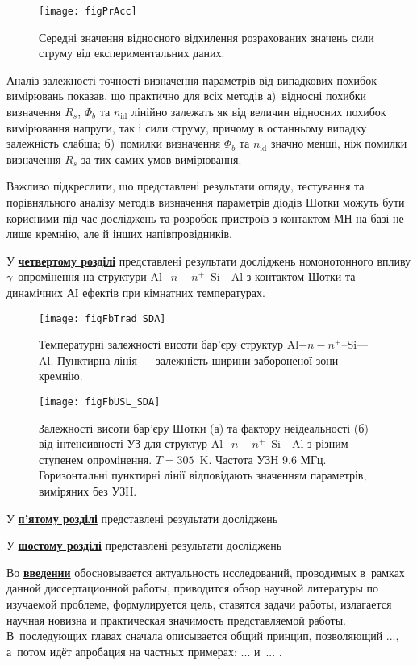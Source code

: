 \documentclass[a5paper,10pt,twoside,openany,article]{memoir} %
\begin{document}
\begin{figure}
\center
\texttt{[image: figPrAcc]}%
\caption{\label{figPrAcc}
Середні значення відносного відхилення розрахованих значень сили струму від експериментальних даних.
}
\end{figure}


Аналіз залежності точності визначення параметрів від випадкових похибок вимірювань показав, що практично для всіх методів
а)~відносні похибки визначення $R_s$, $\Phi_b$ та $n_\mathrm{id}$ лінійно залежать як від величин відносних похибок вимірювання напруги, так і сили струму, причому в останньому випадку залежність слабша;
б)~помилки визначення $\Phi_b$ та $n_\mathrm{id}$ значно менші, ніж помилки визначення $R_s$ за тих самих умов вимірювання.

Важливо підкреслити, що представлені результати огляду, тестування та порівняльного аналізу методів визначення параметрів діодів Шотки можуть бути корисними під час досліджень та розробок пристроїв з контактом МН на базі не лише кремнію, але й інших напівпровідників.


У  \underline{\textbf{четвертому розділі}} представлені результати досліджень 
номонотонного впливу $\gamma$--опромінення на структури Al$-n-n^+$--Si---Al з контактом Шотки та 
динамічних АІ ефектів при кімнатних температурах.


\begin{figure}
\center
\texttt{[image: figFbTrad\_SDA]}
\caption{\label{figFbTrad_SDA}
Температурні залежності висоти бар'єру структур Al$-n-n^+$--Si---Al.
Пунктирна лінія --- залежність ширини забороненої зони кремнію.
}%
\end{figure}


\begin{figure}
\center
\texttt{[image: figFbUSL\_SDA]}
\caption{\label{figFbUSL_SDA}
Залежності висоти бар'єру Шотки (а) та фактору неідеальності (б)  від інтенсивності УЗ для
структур Al$-n-n^+$--Si---Al з різним ступенем опромінення.
$T=305$~K.
Частота УЗН 9,6 МГц.
Горизонтальні пунктирні лінії відповідають значенням параметрів, виміряних без УЗН.
}%
\end{figure}



У  \underline{\textbf{п'ятому розділі}} представлені результати досліджень


У  \underline{\textbf{шостому розділі}} представлені результати досліджень


Во \underline{\textbf{введении}} обосновывается актуальность
исследований, проводимых в~рамках данной диссертационной работы,
приводится обзор научной литературы по изучаемой проблеме,
формулируется цель, ставятся задачи работы, излагается научная новизна
и практическая значимость представляемой работы. В~последующих главах
сначала описывается общий принцип, позволяющий ..., а~потом идёт
апробация на частных примерах: ...  и~... .
\end{document}
